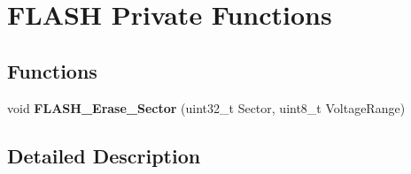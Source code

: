 \hypertarget{group___f_l_a_s_h_ex___private___functions}{}\section{F\+L\+A\+SH Private Functions}
\label{group___f_l_a_s_h_ex___private___functions}
\subsection*{Functions}
\begin{DoxyCompactItemize}
\item 
\mbox{\label{group___f_l_a_s_h_ex___private___functions_ga98c9d95cedcc4bfd39cdee82d07c0792}} 
void {\bfseries F\+L\+A\+S\+H\+\_\+\+Erase\+\_\+\+Sector} (uint32\+\_\+t Sector, uint8\+\_\+t Voltage\+Range)
\end{DoxyCompactItemize}


\subsection{Detailed Description}
